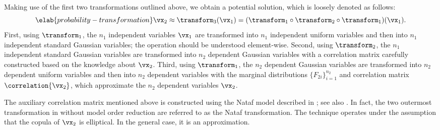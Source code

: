 Making use of the first two transformations outlined above, we obtain a
potential solution, which is loosely denoted as follows:
\begin{equation} \elab{probability-transformation}
  \vx_2 \approx \transform_3(\vx_1) = (\transform_1 \circ \transform_2 \circ \transform_1)(\vx_1).
\end{equation}
First, using $\transform_1$, the $n_1$ independent variables $\vx_1$ are
transformed into $n_1$ independent uniform variables and then into $n_1$
independent standard Gaussian variables; the operation should be understood
element-wise. Second, using $\transform_2$, the $n_1$ independent standard
Gaussian variables are transformed into $n_2$ dependent Gaussian variables with
a correlation matrix carefully constructed based on the knowledge about $\vx_2$.
Third, using $\transform_1$, the $n_2$ dependent Gaussian variables are
transformed into $n_2$ dependent uniform variables and then into $n_2$ dependent
variables with the marginal distributions $\{ F_{2i} \}_{i = 1}^{n_2}$ and
correlation matrix $\correlation{\vx_2}$, which approximate the $n_2$ dependent
variables $\vx_2$.

The auxiliary correlation matrix mentioned above is constructed using the Nataf
model described in \cite{liu1986}; see also \cite{li2008}. In fact, the two
outermost transformation in  without model
order reduction are referred to as the Nataf transformation. The technique
operates under the assumption that the copula of $\vx_2$ is elliptical. In the
general case, it is an approximation.
